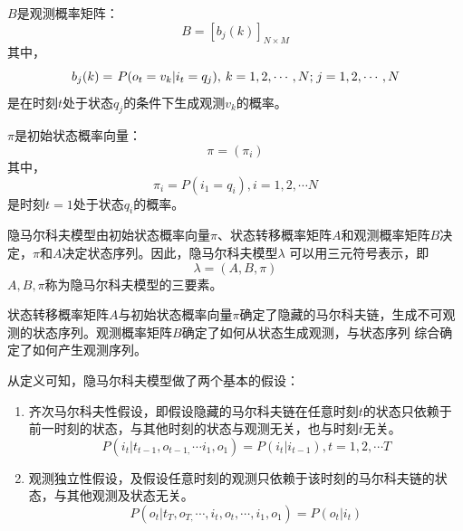     $B$是观测概率矩阵：
    \begin{equation}
    B = {\left[ {{b_{j}(k)}} \right]_{N \times M}}
    \end{equation}
    其中，
    \begin{equation}
    {b_{j}(k)} = {\kern 1pt} P({o_t} = {v_k}|{i_t} = {q_j}),{\kern 1pt} {\kern 1pt} k = 1,2, \cdots ,N;{\kern 1pt} j = 1,2, \cdots ,N
    \end{equation}
    是在时刻$t$处于状态$q_j$的条件下生成观测$v_k$的概率。

    $\pi$是初始状态概率向量：
    \begin{equation}
    \pi  = ({\pi _i})
    \end{equation}
    其中，
    \begin{equation}
    {\pi _i} = P({i_1} = {q_i}),i = 1,2, \cdots N
    \end{equation}
    是时刻$t=1$处于状态$q_i$的概率。

    隐马尔科夫模型由初始状态概率向量$\pi$、状态转移概率矩阵$A$和观测概率矩阵$B$决定，$\pi$和$A$决定状态序列。因此，隐马尔科夫模型$\lambda $
    可以用三元符号表示，即
    \begin{equation}
    \lambda  = \left( {A,B,\pi } \right)
    \end{equation}
    ${A,B,\pi }$称为隐马尔科夫模型的三要素。

    状态转移概率矩阵$A$与初始状态概率向量$\pi$确定了隐藏的马尔科夫链，生成不可观测的状态序列。观测概率矩阵$B$确定了如何从状态生成观测，与状态序列
    综合确定了如何产生观测序列。

    从定义可知，隐马尔科夫模型做了两个基本的假设：
    \vspace{-10pt}
    \begin{enumerate}
    	\item 齐次马尔科夫性假设，即假设隐藏的马尔科夫链在任意时刻$t$的状态只依赖于前一时刻的状态，与其他时刻的状态与观测无关，也与时刻$t$无关。
            \begin{equation}
            P({i_t}|{t_{t - 1}},{o_{t - 1,}} \cdots {i_1},{o_1}) = P({i_t}|{i_{t - 1}}),t = 1,2, \cdots T
            \end{equation}
        \item 观测独立性假设，及假设任意时刻的观测只依赖于该时刻的马尔科夫链的状态，与其他观测及状态无关。
            \begin{equation}
            P({o_t}|{t_T},{o_{T,}} \cdots ,{i_t},{o_t}, \cdots ,{i_1},{o_1}) = P({o_t}|{i_t})
            \end{equation}
    \end{enumerate}
    \vspace{-10pt}

